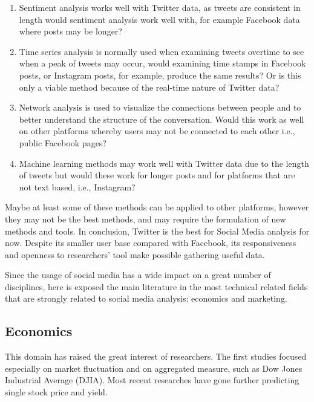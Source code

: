\documentclass[]{book}
\providecommand{\tightlist}{%
  \setlength{\itemsep}{0pt}\setlength{\parskip}{0pt}}
\begin{document}
\begin{enumerate}
\def\labelenumi{\arabic{enumi}.}
\tightlist
\item
  Sentiment analysis works well with Twitter data, as tweets are
  consistent in length would sentiment analysis work well with, for
  example Facebook data where posts may be longer?
\item
  Time series analysis is normally used when examining tweets overtime
  to see when a peak of tweets may occur, would examining time stamps in
  Facebook posts, or Instagram posts, for example, produce the same
  results? Or is this only a viable method because of the real-time
  nature of Twitter data?
\item
  Network analysis is used to visualize the connections between people
  and to better understand the structure of the conversation. Would this
  work as well on other platforms whereby users may not be connected to
  each other i.e., public Facebook pages?
\item
  Machine learning methods may work well with Twitter data due to the
  length of tweets but would these work for longer posts and for
  platforms that are not text based, i.e., Instagram?
\end{enumerate}

Maybe at least some of these methods can be applied to other platforms,
however they may not be the best methods, and may require the
formulation of new methods and tools. In conclusion, Twitter is the best
for Social Media analysis for now. Despite its smaller user base
compared with Facebook, its responsiveness and openness to researchers'
tool make possible gathering useful data.

Since the usage of social media has a wide impact on a great number of
disciplines, here is exposed the main literature in the most technical
related fields that are strongly related to social media analysis:
economics and marketing.

\subsection{Economics}\label{economics}

This domain has raised the great interest of researchers. The first
studies focused especially on market fluctuation and on aggregated
measure, such as Dow Jones Industrial Average (DJIA). Most recent
researches have gone further predicting single stock price and yield.
\end{document}
